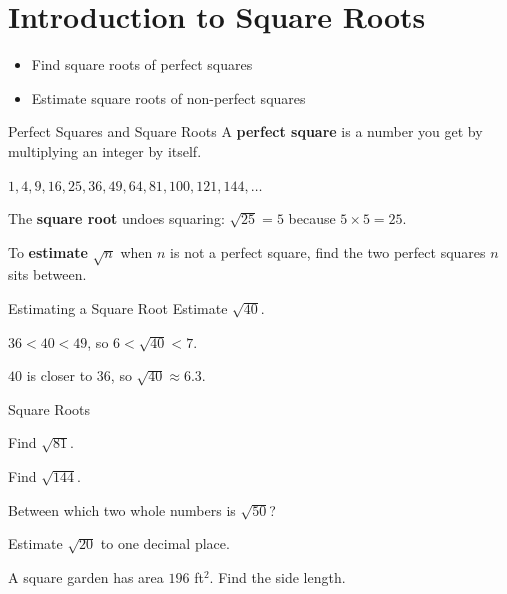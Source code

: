 \section{Introduction to Square Roots}

\begin{learningGoals}
\begin{itemize}
    \item Find square roots of perfect squares
    \item Estimate square roots of non-perfect squares
\end{itemize}
\end{learningGoals}

\begin{conceptBox}{Perfect Squares and Square Roots}
A \textbf{perfect square} is a number you get by multiplying an integer by itself.

$1, 4, 9, 16, 25, 36, 49, 64, 81, 100, 121, 144, \ldots$

The \textbf{square root} undoes squaring: $\sqrt{25} = 5$ because $5 \times 5 = 25$.

To \textbf{estimate} $\sqrt{n}$ when $n$ is not a perfect square, find the two perfect squares $n$ sits between.
\end{conceptBox}

\begin{workedExample}{Estimating a Square Root}
Estimate $\sqrt{40}$.

$36 < 40 < 49$, so $6 < \sqrt{40} < 7$.

$40$ is closer to $36$, so $\sqrt{40} \approx 6.3$.
\end{workedExample}


\begin{practiceBox}{Square Roots}
\resetProblems

\prob Find $\sqrt{81}$.

\prob Find $\sqrt{144}$.

\prob Between which two whole numbers is $\sqrt{50}$?

\prob Estimate $\sqrt{20}$ to one decimal place.

\prob A square garden has area $196$ ft$^2$. Find the side length.

\end{practiceBox}
